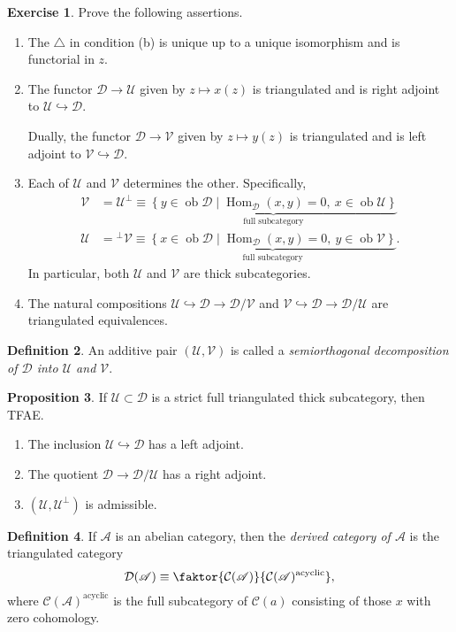 \documentclass[10pt,letterpaper,cm]{nupset}
\theoremstyle{definition}
\newtheorem{definition}{Definition}[subsection]
\theoremstyle{theorem}
\newtheorem{prop}[definition]{Proposition}
\newtheorem{exercise}[definition]{Exercise}
\theoremstyle{remark}
\newcommand{\D}{\mathcal{D}}
\newcommand{\1}{\mathbf{1}}
\renewcommand{\a}{\mathscr{A}}
\renewcommand{\d}{\mathscr{D}}
\renewcommand{\u}{\mathscr{U}}
\renewcommand{\v}{\mathscr{V}}
\newcommand{\0}{\vec 0}
\DeclareMathOperator{\ob}{ob}
\DeclareMathOperator{\Hom}{Hom}
\DeclareMathOperator{\acyc}{acyclic}
\begin{document}
\begin{exercise} Prove the following assertions.
\begin{enumerate}
\item The $\triangle$ in condition (b) is unique up to a unique isomorphism and is functorial in $z$.
\item The functor $\d \to \u$ given by $z \mapsto x(z)$ is triangulated and is right adjoint to $\u \hookrightarrow \d$. 

Dually, the functor $\d \to \v$ given by $z \mapsto y(z)$ is triangulated and is left adjoint to $\v \hookrightarrow \d$.
\item Each of $\u$ and $\v$ determines the other. Specifically, 
\begin{align*} \v & = \u^{\perp} \equiv \underbrace{\left\{y \in \ob{\d} \mid \Hom_{\d}(x,y) = 0, \ x \in \ob{\u}\right\}}_{\text{full subcategory}}
\\ \u  & = {^{\perp}{\v}} \equiv \underbrace{\left\{x \in \ob{\d} \mid \Hom_{\d}(x,y) =0, \ y \in \ob{\v}\right\}}_{\text{full subcategory}}.
\end{align*} In particular, both $\u$ and $\v$ are thick subcategories. 
\item The natural compositions $\u \hookrightarrow \d \to \d/\v$ and $\v \hookrightarrow \d \to \d/\u$ are triangulated equivalences. 
\end{enumerate}
\end{exercise}

\begin{definition}
An additive pair $\left(\u, \v\right)$ is called a \textit{semiorthogonal decomposition of $\d$ into $\u$ and $\v$}.
\end{definition}

\begin{prop}
If $\u \subset \d$ is a strict full triangulated thick subcategory, then TFAE.
\begin{enumerate}
\item The inclusion $\u \hookrightarrow \d$ has a left adjoint.
\item The quotient $\d \to \d/\u$ has a right adjoint.
\item $\left(\u, \u^{\perp}\right)$ is admissible. 
\end{enumerate}
\end{prop}

\begin{definition}
If $\a$ is an abelian category, then the \textit{derived category of $\a$} is the triangulated category $$ \D(\a) \equiv \faktor{\mathcal{C}(\a)}{\mathcal{C}(\a)^{\acyc}}  , $$ where $\mathcal{C}(\a)^{\acyc}$ is the full subcategory of $\mathcal{C}(a)$ consisting of those $x$ with zero cohomology. 
\end{definition}
\end{document}
